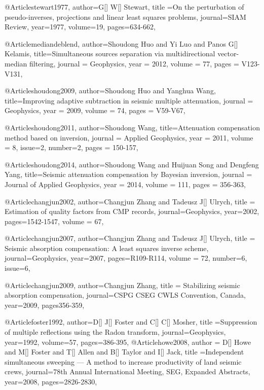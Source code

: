 @Article{stewart1977,
  author={G[] W[] Stewart},
  title ={On the perturbation of pseudo-inverses, projections and linear least squares problems},
  journal={SIAM Review},
  year=1977,
  volume=19,
  pages={634-662},
}

@Article{mediandeblend,
  author={Shoudong Huo and Yi Luo and Panos G[] Kelamis},
  title={Simultaneous sources separation via multidirectional vector-median filtering},
  journal = 	 {Geophysics},
  year = 	 2012,
  volume =	 77,
  pages =	 {V123-V131},
}

@Article{shoudong2009,
  author={Shoudong Huo and Yanghua Wang},
  title={Improving adaptive subtraction in seismic multiple attenuation},
  journal = 	 {Geophysics},
  year = 	 2009,
  volume =	 74,
  pages =	 {V59-V67},
}

@Article{shoudong2011,
  author={Shoudong Wang},
  title={Attenuation compensation method based on inversion},
  journal = 	 {Applied Geophysics},
  year = 	 2011,
  volume =	 8,
  issue=2,
  number=2,
  pages =	 {150-157},
}

@Article{shoudong2014,
  author={Shoudong Wang and Huijuan Song and Dengfeng Yang},
  title={Seismic attenuation compensation by Bayesian inversion},
  journal = 	 {Journal of Applied Geophysics},
  year = 	 2014,
  volume =	 111,
  pages =	 {356-363},
}

@Article{changjun2002,
  author={Changjun Zhang and Tadeusz J[] Ulrych},
  title = {Estimation of quality factors from CMP records},
  journal={Geophysics},
  year=2002,
  pages={1542-1547},
  volume = 67,
}

@Article{changjun2007,
  author={Changjun Zhang and Tadeusz J[] Ulrych},
  title = {Seismic absorption compensation: A least squares inverse scheme},
  journal={Geophysics},
  year=2007,
  pages={R109-R114},
  volume = 72,
  number=6,
  issue=6,
}

@Article{changjun2009,
  author={Changjun Zhang},
  title = {Stabilizing seismic absorption compensation},
  journal={CSPG CSEG CWLS Convention, Canada},
  year=2009,
  pages{356-359},
}



@Article{foster1992,
  author={D[] J[] Foster and C[] C[] Mosher},
  title ={Suppression of multiple reflections using the Radon transform},
  journal={Geophysics},
  year=1992,
  volume=57,
  pages={386-395},
}
@Article{howe2008,
  author = {D[] Howe and M[] Foster and T[] Allen and B[] Taylor and I[] Jack},
  title ={Independent simultaneous sweeping — A
method to increase productivity of land seismic crews},
  journal={78th Annual International Meeting, SEG,
Expanded Abstracts},
  year=2008,
  pages={2826-2830},
}

